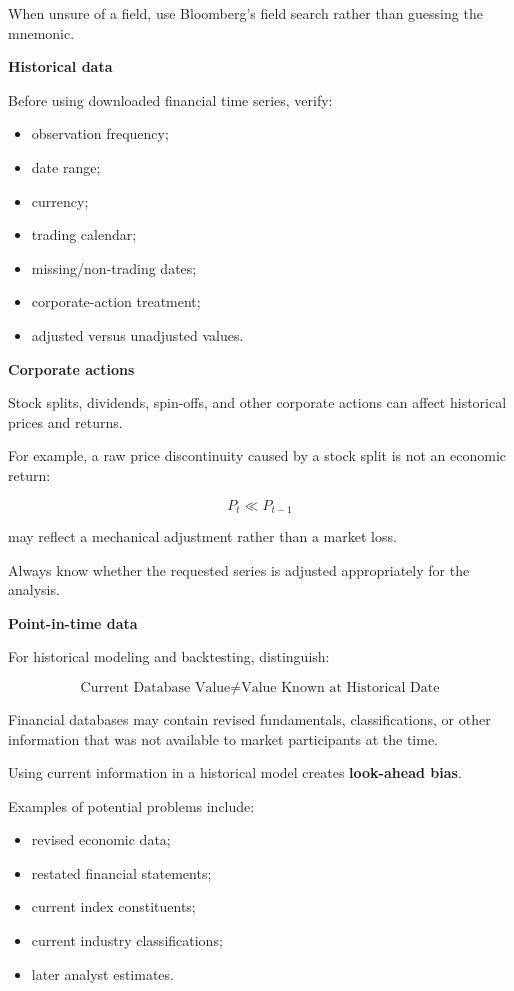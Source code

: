 \documentclass[11pt,letterpaper]{article}
\begin{document}
When unsure of a field, use Bloomberg's field search rather than guessing the
mnemonic.

\textbf{Historical data}

Before using downloaded financial time series, verify:

\begin{itemize}[leftmargin=*]
    \item observation frequency;
    \item date range;
    \item currency;
    \item trading calendar;
    \item missing/non-trading dates;
    \item corporate-action treatment;
    \item adjusted versus unadjusted values.
\end{itemize}

\textbf{Corporate actions}

Stock splits, dividends, spin-offs, and other corporate actions can affect
historical prices and returns.

For example, a raw price discontinuity caused by a stock split is not an
economic return:

\[
P_t \ll P_{t-1}
\]

may reflect a mechanical adjustment rather than a market loss.

Always know whether the requested series is adjusted appropriately for the
analysis.

\textbf{Point-in-time data}

For historical modeling and backtesting, distinguish:

\[
\text{Current Database Value}
\neq
\text{Value Known at Historical Date}
\]

Financial databases may contain revised fundamentals, classifications, or
other information that was not available to market participants at the time.

Using current information in a historical model creates
\textbf{look-ahead bias}.

Examples of potential problems include:

\begin{itemize}[leftmargin=*]
    \item revised economic data;
    \item restated financial statements;
    \item current index constituents;
    \item current industry classifications;
    \item later analyst estimates.
\end{itemize}
\end{document}
